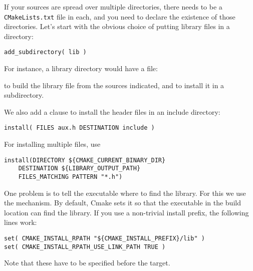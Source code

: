 \begin{floatingfigure}[r]{2.5in}
  \begin{minipage}{2.5in}
  \end{minipage}
\end{floatingfigure}
%
If your sources are spread over multiple directories,
there needs to be a \texttt{CMakeLists.txt} file in each,
and you need to declare the existence of those directories.
Let's start with the obvious choice of putting library files in a  directory:
\begin{lstlisting}
add_subdirectory( lib )
\end{lstlisting}
For instance, a library directory would have a  file:
%

%
to build the library file from the sources indicated,
and to install it in a  subdirectory.

We also add a clause to install the header files in an include directory:
\begin{lstlisting}
install( FILES aux.h DESTINATION include )
\end{lstlisting}
For installing multiple files, use
\begin{lstlisting}
install(DIRECTORY ${CMAKE_CURRENT_BINARY_DIR}
    DESTINATION ${LIBRARY_OUTPUT_PATH}
    FILES_MATCHING PATTERN "*.h")
\end{lstlisting}

One problem is to tell the executable where to find the library.
For this we use the  mechanism.
By default, Cmake sets it so that the executable in the build location
can find the library.
If you use a non-trivial install prefix, the following lines work:
\begin{lstlisting}
set( CMAKE_INSTALL_RPATH "${CMAKE_INSTALL_PREFIX}/lib" )
set( CMAKE_INSTALL_RPATH_USE_LINK_PATH TRUE )
\end{lstlisting}
Note that these have to be specified before the target.


